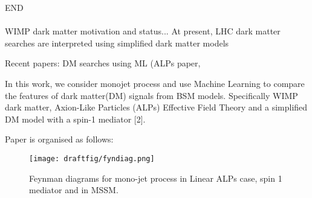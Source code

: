 \documentclass[aps,onecolumn,showpacs,superscriptaddress,groupedaddress,nofootinbib,preprint]{revtex4-1}
\begin{document}
END
\\
\\

WIMP dark matter motivation and status...
At present, LHC dark matter searches are interpreted using simplified dark matter models

Recent papers: DM searches using ML (ALPs paper,

In this work, we consider monojet process and use Machine Learning to compare the features of dark matter(DM) signals from BSM models. Specifically 
WIMP dark matter, Axion-Like Particles (ALPs) Effective Field Theory \cite{Mimasu:2014nea,Brivio:2017ije} and a simplified DM model with a
spin-1 mediator [2]. 

Paper is organised as follows:

\begin{figure} [H]
\centering
\texttt{[image: draftfig/fyndiag.png]}
\caption{Feynman diagrams for mono-jet process in Linear ALPs case, spin 1 mediator and in MSSM\label{fyndiag}.}
\end{figure}
\end{document}
